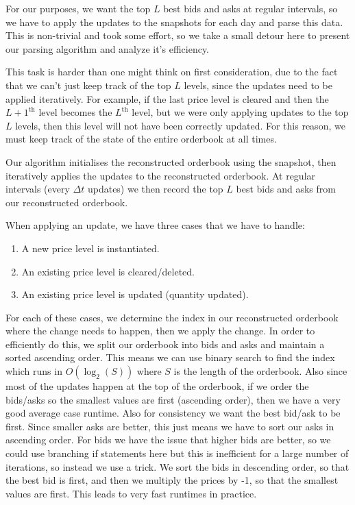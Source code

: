 \documentclass[a4paper, oneside, notitlepage]{book}
\begin{document}
For our purposes, we want the top $L$ best bids and asks at regular intervals, so
we have to apply the updates to the snapshots for each day and parse this data.
This is non-trivial and took some effort, so we take a small detour here to 
present our parsing algorithm and analyze it's efficiency.

This task is harder than one might think on first consideration, due to the fact
that we can't just keep track of the top $L$ levels, since the updates need to be applied
iteratively. For example, if the last price level is cleared and then the $L+1^{\text{th}}$ level
becomes the $L^{\text{th}}$ level, but we were only applying updates to the top $L$ levels,
then this level will not have been correctly updated. For this reason, we must keep track
of the state of the entire orderbook at all times.

Our algorithm initialises the reconstructed orderbook using the snapshot, then iteratively applies
the updates to the reconstructed orderbook. At regular intervals (every $\Delta t$ updates) we
then record the top $L$ best bids and asks from our reconstructed orderbook.

When applying an update, we have three cases that we have to handle:
\begin{enumerate}
    \item A new price level is instantiated.
    \item An existing price level is cleared/deleted.
    \item An existing price level is updated (quantity updated).
\end{enumerate}

For each of these cases, we determine the index in our reconstructed orderbook
where the change needs to happen, then we apply the change. In order to efficiently do this, we split our
orderbook into bids and asks and maintain a sorted ascending order.
This means we can use binary search to find the index which runs in $O(\log_2(S))$ 
where $S$ is the length of the orderbook. Also since most of the updates
happen at the top of the orderbook, if we order the bids/asks so the smallest values
are first (ascending order), then we have a very good average case runtime.
Also for consistency we want the best bid/ask to be first.
Since smaller asks are better, this just means we have to sort our asks in 
ascending order. For bids we have the issue that higher bids are better,
so we could use branching if statements here but this is inefficient for a large
number of iterations, so instead we use a trick. We sort the bids in descending order,
so that the best bid is first, and then we multiply the prices by -1, so that
the smallest values are first. This leads to very fast runtimes in practice.
\end{document}
